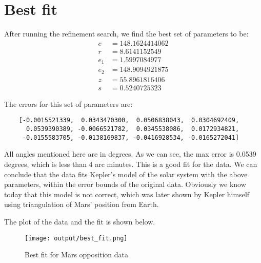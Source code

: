 \documentclass[12pt]{article}
\begin{document}
\section*{Best fit}
After running the refinement search, we find the best set of parameters to be:
\begin{align*}
    c &= 148.1624414062 \\
    r &= 8.6141152549 \\
    e_1 &= 1.5997084977 \\
    e_2 &= 148.9094921875 \\
    z &= 55.8961816406 \\
    s &= 0.5240725323
\end{align*}

The errors for this set of parameters are:
\begin{verbatim}
    [-0.0015521339,  0.0343470300,  0.0506838043,  0.0304692409,
      0.0539390389, -0.0066521782,  0.0345538086,  0.0172934821,
     -0.0155583705, -0.0138169837, -0.0416928534, -0.0165272041]        
\end{verbatim}

\medskip
All angles mentioned here are in degrees. As we can see, the max error is 0.0539 degrees, which is less than 4 arc minutes. This is a good fit for the data. We can conclude that the data fits Kepler's model of the solar system with the above parameters, within the error bounds of the original data. Obviously we know today that this model is not correct, which was later shown by Kepler himself using triangulation of Mars' position from Earth.

The plot of the data and the fit is shown below.

\pagebreak
\begin{figure}[h]
    \centering
    \texttt{[image: output/best\_fit.png]}
    \caption{Best fit for Mars opposition data}
\end{figure}
\end{document}
